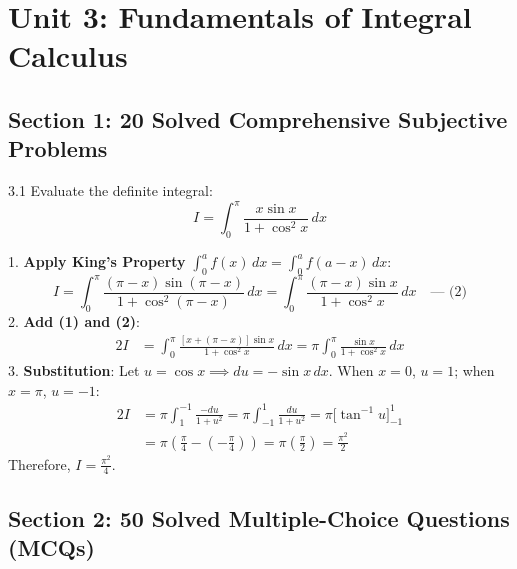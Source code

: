 \chapter{Unit 3: Fundamentals of Integral Calculus}

\section{Section 1: 20 Solved Comprehensive Subjective Problems}

\begin{subjectiveq}{3.1}
Evaluate the definite integral:
\begin{equation}
I = \int_0^\pi \frac{x \sin x}{1 + \cos^2 x}\,dx
\end{equation}
\end{subjectiveq}

\begin{solbox}
1. \textbf{Apply King's Property} $\int_0^a f(x)\,dx = \int_0^a f(a-x)\,dx$:
\begin{equation}
I = \int_0^\pi \frac{(\pi - x) \sin(\pi - x)}{1 + \cos^2(\pi - x)}\,dx = \int_0^\pi \frac{(\pi - x)\sin x}{1 + \cos^2 x}\,dx \quad \text{--- (2)}
\end{equation}
2. \textbf{Add (1) and (2)}:
\begin{align}
2I &= \int_0^\pi \frac{[x + (\pi - x)]\sin x}{1 + \cos^2 x}\,dx = \pi \int_0^\pi \frac{\sin x}{1 + \cos^2 x}\,dx
\end{align}
3. \textbf{Substitution}:
Let $u = \cos x \implies du = -\sin x\,dx$.
When $x = 0$, $u = 1$; when $x = \pi$, $u = -1$:
\begin{align}
2I &= \pi \int_1^{-1} \frac{-du}{1 + u^2} = \pi \int_{-1}^1 \frac{du}{1 + u^2} = \pi \Big[ \tan^{-1}u \Big]_{-1}^1 \\
&= \pi \left( \frac{\pi}{4} - \left(-\frac{\pi}{4}\right) \right) = \pi \left( \frac{\pi}{2} \right) = \frac{\pi^2}{2}
\end{align}
Therefore, $I = \frac{\pi^2}{4}$.
\end{solbox}

\section{Section 2: 50 Solved Multiple-Choice Questions (MCQs)}

